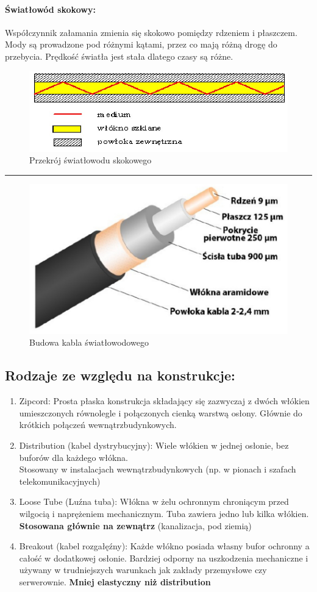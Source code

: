 \documentclass{article}
\begin{document}
\paragraph{Światłowód skokowy:} Współczynnik załamania zmienia się skokowo pomiędzy rdzeniem i płaszczem. Mody są prowadzone pod różnymi kątami, przez co mają różną drogę do przebycia. Prędkość światła jest stała dlatego czasy są różne.
\begin{figure}[H]
    \centering
    \includegraphics[width=0.6\linewidth]{w03z05.jpg}
    \caption{Przekrój światłowodu skokowego}
\end{figure}
\hrule
\begin{figure}[H]
    \centering
    \includegraphics[width=0.6\linewidth]{w03z06.jpg}
    \caption{Budowa kabla światłowodowego}
\end{figure}
\subsection{Rodzaje ze względu na konstrukcje:}
\begin{enumerate}
    \item Zipcord: Prosta płaska konstrukcja składający się zazwyczaj z dwóch włókien umieszczonych równolegle i połączonych cienką warstwą osłony. Głównie do krótkich połączeń wewnątrzbudynkowych.
    \item Distribution (kabel dystrybucyjny): Wiele włókien w jednej osłonie, bez buforów dla każdego włókna.\\ Stosowany w instalacjach wewnątrzbudynkowych (np. w pionach i szafach telekomunikacyjnych)
    \item Loose Tube (Luźna tuba): Włókna w żelu ochronnym chroniącym przed wilgocią i naprężeniem mechanicznym. Tuba zawiera jedno lub kilka włókien.\\ \textbf{Stosowana głównie na zewnątrz} (kanalizacja, pod ziemią)
    \item Breakout (kabel rozgałęźny): Każde włókno posiada własny bufor ochronny a całość w dodatkowej osłonie. Bardziej odporny na uszkodzenia mechaniczne i używany w trudniejszych warunkach jak zakłady przemysłowe czy serwerownie. \textbf{Mniej elastyczny niż distribution}
\end{enumerate}
\end{document}
